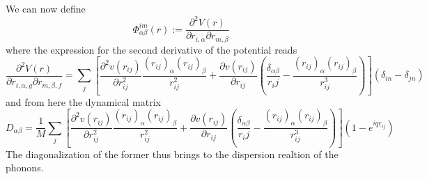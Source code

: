 \documentclass[a4paper]{article}
\begin{document}
        
        We can now define 
        \begin{equation}
            \Phi_{\alpha\beta}^{im}(r):=\frac{\partial^2 V(r)}{\partial r_{i,\alpha}\partial r_{m,\beta}}
        \end{equation}
        where the expression for the second derivative of the potential reads
        \begin{equation*}
            \frac{\partial^2 V(r)}{\partial r_{i,\alpha,g}\partial r_{m,\beta,f}} = \sum_j\left[\frac{\partial^2 v(r_{ij})}{\partial r_{ij}^2}\frac{(r_{ij})_{\alpha}(r_{ij})_{\beta}}{r_{ij}^2} + \frac{\partial v(r_{ij})}{\partial r_{ij}}\left(\frac{\delta_{\alpha\beta}}{r_ij}-\frac{(r_{ij})_{\alpha}(r_{ij})_{\beta}}{r_{ij}^3}\right)\right](\delta_{in}-\delta_{jn})
        \end{equation*}
        and from here the dynamical matrix
        \begin{equation}
            D_{\alpha\beta} = \frac{1}{M}\sum_j\left[\frac{\partial^2 v(r_{ij})}{\partial r_{ij}^2}\frac{(r_{ij})_{\alpha}(r_{ij})_{\beta}}{r_{ij}^2} + \frac{\partial v(r_{ij})}{\partial r_{ij}}\left(\frac{\delta_{\alpha\beta}}{r_ij}-\frac{(r_{ij})_{\alpha}(r_{ij})_{\beta}}{r_{ij}^3}\right)\right]\left(1-e^{i\underline{q}\underline{r}_{ij}}\right)
        \end{equation}
        The diagonalization of the former thus brings to the dispersion realtion of the phonons.
    
%
%
\end{document}
